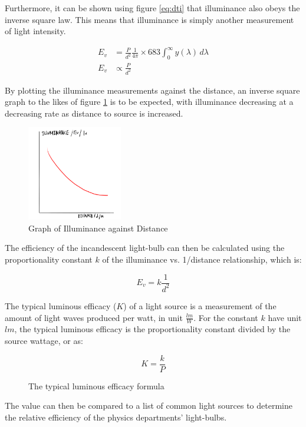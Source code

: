 \documentclass[a4paper,12pt]{article}
\begin{document}
Furthermore, it can be shown using figure \ref{eq:dti} that illuminance also obeys the inverse square law. This means that illuminance is simply another measurement of light intensity.

\begin{align*}
 E_v &=  \frac{P}{d^2} \frac{1}{4\pi} \times 683 \int_{0}^{\infty} y(\lambda) \, d\lambda\\
 E_v &\propto \frac{P}{d^2}
\end{align*}

By plotting the illuminance measurements against the distance, an inverse square graph to the likes of figure \ref{fig:relation} is to be expected, with illuminance decreasing at a decreasing rate as distance to source is increased.

\begin{figure}[H]
    \centering
    \includegraphics[width=0.37\textwidth]{assets/relationship.png}
    \caption{Graph of Illuminance against Distance}
    \label{fig:relation}
\end{figure}

The efficiency of the incandescent light-bulb can then be calculated using the proportionality constant $k$ of the illuminance vs. 1/distance relationship, which is:

\[
E_v = k \frac{1}{d^2}
\]

The typical luminous efficacy ($K$) of a light source is a measurement of the amount of light waves produced per watt, in unit $\frac{\si{lm}}{W}$. For the constant $k$ have unit $\si{lm}$, the typical luminous efficacy is the proportionality constant divided by the source wattage, or as:

\begin{figure}[H]
    \[
    K = \frac{k}{P}
    \]
    \caption{The typical luminous efficacy formula}
    \label{fig:tle}
\end{figure}

The value can then be compared to a list of common light sources to determine the relative efficiency of the physics departments' light-bulbs.
\end{document}
